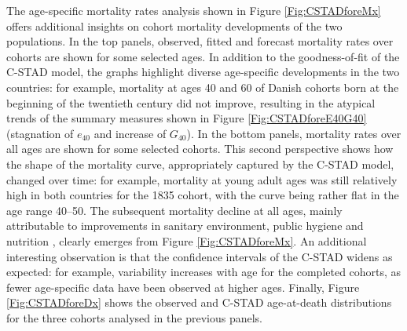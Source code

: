 \documentclass[11pt, a4paper]{article}
\begin{document}
The age-specific mortality rates analysis shown in Figure \ref{Fig:CSTADforeMx} offers additional insights on cohort mortality developments of the two populations. In the top panels, observed, fitted and forecast mortality rates over cohorts are shown for some selected ages. In addition to the goodness-of-fit of the C-STAD model, the graphs highlight diverse age-specific developments in the two countries: for example, mortality at ages 40 and 60 of Danish cohorts born at the beginning of the twentieth century did not improve, resulting in the atypical trends of the summary measures shown in Figure \ref{Fig:CSTADforeE40G40} (stagnation of $e_{40}$ and increase of $G_{40}$). In the bottom panels, mortality rates over all ages are shown for some selected cohorts. This second perspective shows how the shape of the mortality curve, appropriately captured by the C-STAD model, changed over time: for example, mortality at young adult ages was still relatively high in both countries for the 1835 cohort, with the curve being rather flat in the age range 40--50. The subsequent mortality decline at all ages, mainly attributable to improvements in sanitary environment, public hygiene and nutrition \citep{mckeown1976modern}, clearly emerges from Figure \ref{Fig:CSTADforeMx}. An additional interesting observation is that the confidence intervals of the C-STAD widens as expected: for example, variability increases with age for the completed cohorts, as fewer age-specific data have been observed at higher ages. Finally, Figure \ref{Fig:CSTADforeDx} shows the observed and C-STAD age-at-death distributions for the three cohorts analysed in the previous panels. 
\end{document}
